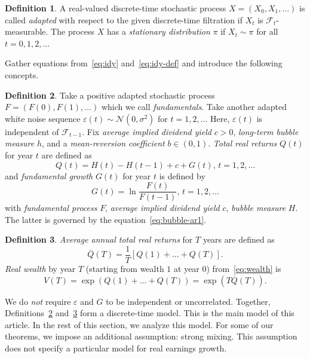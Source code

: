 \documentclass[12pt]{amsart}
\theoremstyle{definition}
\newtheorem{definition}{Definition}
\begin{document}
\begin{definition} A real-valued discrete-time stochastic process $X = (X_0, X_1, \ldots)$ is called {\it adapted} with respect to the given discrete-time filtration if $X_t$ is $\mathcal F_t$-measurable. The process $X$ has a {\it stationary distribution} $\pi$ if $X_t \sim \pi$ for all $t = 0, 1, 2, \ldots$
\label{defn:general}
\end{definition}

Gather equations from~\eqref{eq:idy} and~\eqref{eq:idy-def} and introduce the following concepts.

\begin{definition} Take a positive adapted stochastic process $F = (F(0), F(1), \ldots)$ which we call {\it fundamentals}. Take another adapted white noise sequence $\varepsilon(t) \sim \mathcal N(0, \sigma^2)$ for $t = 1, 2, \ldots$ Here, $\varepsilon(t)$ is independent of $\mathcal F_{t-1}$. Fix {\it average implied dividend yield} $c > 0$, {\it long-term bubble measure} $h$, and a {\it mean-reversion coefficient} $b \in (0, 1)$. {\it Total real returns} $Q(t)$ for year $t$ are defined as
\begin{equation}
\label{eq:model}
Q(t) = H(t) - H(t-1) + c + G(t),\, t = 1, 2, \ldots
\end{equation}
and {\it fundamental growth} $G(t)$ for year $t$ is defined by
\begin{equation}
\label{eq:growth-def}
G(t) = \ln\frac{F(t)}{F(t-1)},\, t = 1, 2, \ldots
\end{equation}
with {\it fundamental process} $F$, {\it average implied dividend yield} $c$, {\it bubble measure} $H$.  The latter is governed by the equation~\eqref{eq:bubble-ar1}. 
\label{defn:process}
\end{definition}

\begin{definition} {\it Average annual total real returns} for $T$ years are defined as 
\begin{equation}
\label{eq:def-avg}
\overline{Q}(T) = \frac1T\left[Q(1) + \ldots + Q(T)\right].
\end{equation}
{\it Real wealth} by year $T$ (starting from wealth $1$ at year $0$) from~\eqref{eq:wealth} is 
\begin{equation}
\label{eq:def-wealth}
V(T) = \exp(Q(1) + \ldots + Q(T)) = \exp(T\overline{Q}(T)).
\end{equation}
\label{defn:avg}
\end{definition}

We do {\it not} require $\varepsilon$ and $G$ to be independent or uncorrelated. Together, Definitions~\ref{defn:process} and~\ref{defn:avg} form a discrete-time model. This is the main model of this article. In the rest of this section, we analyze this model. For some of our theorems, we impose an additional assumption: strong mixing. This assumption does not specify a particular model for real earnings growth. 
\end{document}
